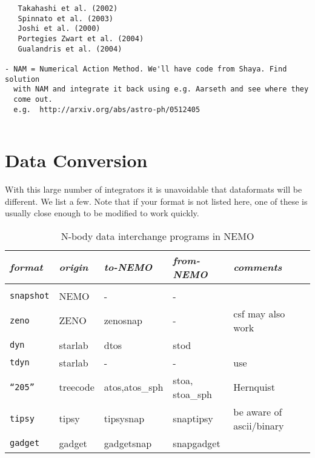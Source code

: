 \begin{itemize}
\begin{itemize}
\begin{verbatim}
   Takahashi et al. (2002)
   Spinnato et al. (2003)  
   Joshi et al. (2000)
   Portegies Zwart et al. (2004)
   Gualandris et al. (2004)

- NAM = Numerical Action Method. We'll have code from Shaya. Find solution
  with NAM and integrate it back using e.g. Aarseth and see where they 
  come out.
  e.g.  http://arxiv.org/abs/astro-ph/0512405
   

\end{verbatim}

\chapter                {Data Conversion}

With this large number of integrators it is unavoidable that dataformats
will be different. We list a few. Note that if your format is not listed
here, one of these is usually close enough to be modified to work quickly.

\begin{center}
\begin{table}[h!]
\caption{N-body data interchange programs in NEMO}
\begin{tabular}{||l|l|l|l|l|l||}

\hline 
{\it format} & {\it origin} & {\it to-NEMO} & {\it from-NEMO} & {\it comments}\\
\hline &&&&\\

{\tt snapshot} & NEMO    &     -       &        -       & \\

{\tt zeno}       &    ZENO   &   zenosnap &     -       &  csf may also work \\

{\tt dyn}      & starlab &     dtos     &     stod      &  \\

{\tt tdyn}     & starlab &     -        &       -       & use  \\

{\tt ``205''}  & treecode &  atos,atos\_sph    &  stoa, stoa\_sph   &   Hernquist \\

{\tt tipsy}    &  tipsy   &    tipsysnap   & snaptipsy     &   be aware of ascii/binary \\

{\tt gadget}    &  gadget  &    gadgetsnap   & snapgadget    &   \\


\end{tabular}
\end{table}
\end{center}
\end{itemize}
\end{itemize}
